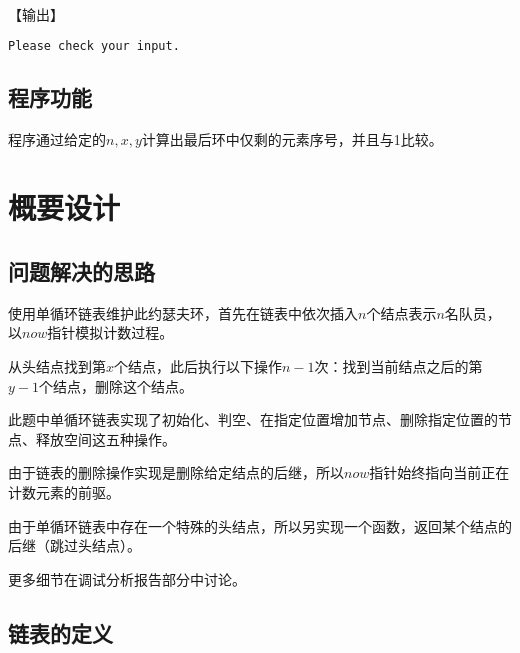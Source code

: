 \documentclass{article}
\begin{document}
【输出】

\begin{lstlisting}[language={bash},
    basicstyle=\small\menlo]
Please check your input.
\end{lstlisting}

\subsection{程序功能}

程序通过给定的$n,x,y$计算出最后环中仅剩的元素序号，并且与1比较。

\section{概要设计}

\subsection{问题解决的思路}

使用单循环链表维护此约瑟夫环，首先在链表中依次插入$n$个结点表示$n$名队员，以$now$指针模拟计数过程。

从头结点找到第$x$个结点，此后执行以下操作$n-1$次：找到当前结点之后的第$y-1$个结点，删除这个结点。

此题中单循环链表实现了初始化、判空、在指定位置增加节点、删除指定位置的节点、释放空间这五种操作。

由于链表的删除操作实现是删除给定结点的后继，所以$now$指针始终指向当前正在计数元素的前驱。

由于单循环链表中存在一个特殊的头结点，所以另实现一个函数，返回某个结点的后继（跳过头结点）。

更多细节在调试分析报告部分中讨论。

\subsection{链表的定义}
\end{document}
